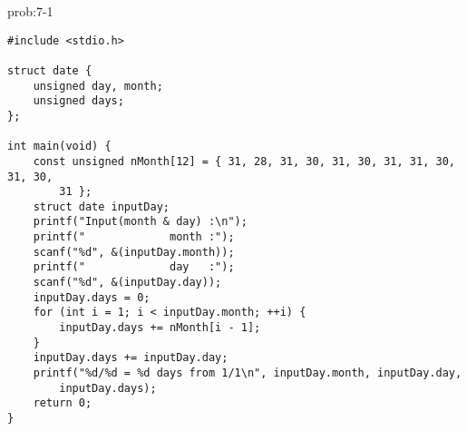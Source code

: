 \begin{renshuu-answer}{prob:7-1}
\baselineskip=12pt
\begin{verbatim}
#include <stdio.h>

struct date {
    unsigned day, month;
    unsigned days;
};

int main(void) {
    const unsigned nMonth[12] = { 31, 28, 31, 30, 31, 30, 31, 31, 30, 31, 30,
        31 };
    struct date inputDay;
    printf("Input(month & day) :\n");
    printf("             month :");
    scanf("%d", &(inputDay.month));
    printf("             day   :");
    scanf("%d", &(inputDay.day));
    inputDay.days = 0;
    for (int i = 1; i < inputDay.month; ++i) {
        inputDay.days += nMonth[i - 1];
    }
    inputDay.days += inputDay.day;
    printf("%d/%d = %d days from 1/1\n", inputDay.month, inputDay.day,
        inputDay.days);
    return 0;
}
\end{verbatim}
\end{renshuu-answer}
